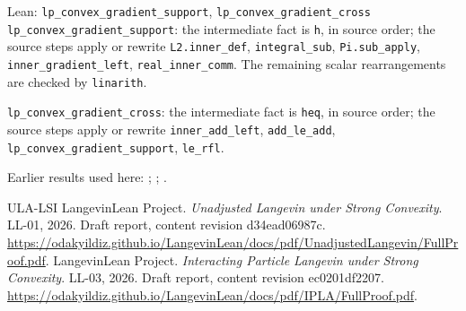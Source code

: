 \documentclass[11pt,a4paper]{article}
\begin{document}
\begin{leanbox}{Lean: \texttt{lp\_\allowbreak{}convex\_\allowbreak{}gradient\_\allowbreak{}support}, \texttt{lp\_\allowbreak{}convex\_\allowbreak{}gradient\_\allowbreak{}cross}}
\texttt{lp\_\allowbreak{}convex\_\allowbreak{}gradient\_\allowbreak{}support}: the intermediate fact is \texttt{h}, in source order; the source steps apply or rewrite \texttt{L2.\allowbreak{}inner\_\allowbreak{}def}, \texttt{integral\_\allowbreak{}sub}, \texttt{Pi.\allowbreak{}sub\_\allowbreak{}apply}, \texttt{inner\_\allowbreak{}gradient\_\allowbreak{}left}, \texttt{real\_\allowbreak{}inner\_\allowbreak{}comm}. The remaining scalar rearrangements are checked by \texttt{linarith}.



\texttt{lp\_\allowbreak{}convex\_\allowbreak{}gradient\_\allowbreak{}cross}: the intermediate fact is \texttt{heq}, in source order; the source steps apply or rewrite \texttt{inner\_\allowbreak{}add\_\allowbreak{}left}, \texttt{add\_\allowbreak{}le\_\allowbreak{}add}, \texttt{lp\_\allowbreak{}convex\_\allowbreak{}gradient\_\allowbreak{}support}, \texttt{le\_\allowbreak{}rfl}.
\end{leanbox}


Earlier results used here: \cite[Section~3.13.2]{LangevinLean2026ULASC}; \cite[Section~3.13.3]{LangevinLean2026ULASC}; \cite[Section~3.2.1]{LangevinLean2026ULASC}.

\begin{thebibliography}{ULA-LSI}
LangevinLean Project. \emph{Unadjusted Langevin under Strong Convexity}. LL-01, 2026. Draft report, content revision d34ead06987c. \url{https://odakyildiz.github.io/LangevinLean/docs/pdf/UnadjustedLangevin/FullProof.pdf}.
LangevinLean Project. \emph{Interacting Particle Langevin under Strong Convexity}. LL-03, 2026. Draft report, content revision ec0201df2207. \url{https://odakyildiz.github.io/LangevinLean/docs/pdf/IPLA/FullProof.pdf}.
\end{thebibliography}
\end{document}
